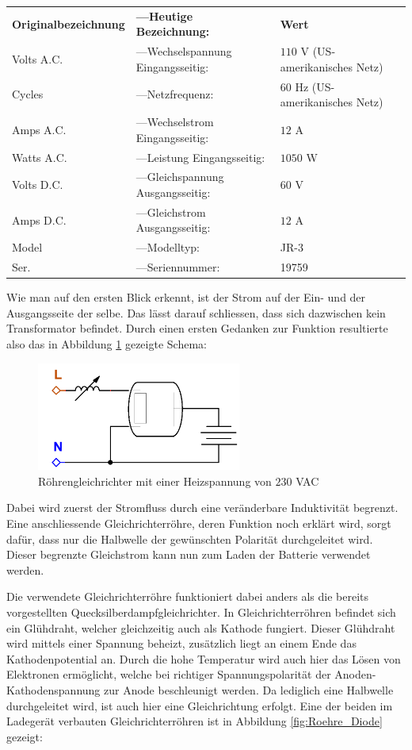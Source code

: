 \begin{tabular}{lll}
	\textbf{Originalbezeichnung} & \textbf{---\quad Heutige Bezeichnung:} & \textbf{Wert} \\
	Volts A.C. & ---\quad Wechselspannung Eingangsseitig: & $110$ V (US-amerikanisches Netz) \\
	Cycles & ---\quad Netzfrequenz: & $60$ Hz (US-amerikanisches Netz)\\
	Amps A.C. & ---\quad Wechselstrom Eingangsseitig: & $12$ A \\
	Watts A.C. & ---\quad Leistung Eingangsseitig: & $1050$ W \\
	Volts D.C. & ---\quad Gleichspannung Ausgangsseitig: & $60$ V \\
	Amps D.C. & ---\quad Gleichstrom Ausgangsseitig: & $12$ A \\
	Model & ---\quad Modelltyp: & JR-3 \\
	Ser. & ---\quad Seriennummer: & 19759
\end{tabular}

Wie man auf den ersten Blick erkennt, ist der Strom auf der Ein- und der Ausgangsseite der selbe. Das lässt darauf schliessen, dass sich dazwischen kein Transformator befindet. Durch einen ersten Gedanken zur Funktion resultierte also das in Abbildung \ref{fig:Ladegeraet1} gezeigte Schema:

\begin{figure}[h]
	\centering
		\includegraphics[width=0.60\textwidth]{images/Ladegeraet_Alt_1.PNG}
	\caption{Röhrengleichrichter mit einer Heizspannung von $230$ VAC}
	\label{fig:Ladegeraet1}
\end{figure}

Dabei wird zuerst der Stromfluss durch eine veränderbare Induktivität begrenzt. Eine anschliessende Gleichrichterröhre, deren Funktion noch erklärt wird, sorgt dafür, dass nur die Halbwelle der gewünschten Polarität durchgeleitet wird. Dieser begrenzte Gleichstrom kann nun zum Laden der Batterie verwendet werden.

Die verwendete Gleichrichterröhre funktioniert dabei anders als die bereits vorgestellten Quecksilberdampfgleichrichter. In Gleichrichterröhren befindet sich ein Glühdraht, welcher gleichzeitig auch als Kathode fungiert. Dieser Glühdraht wird mittels einer Spannung beheizt, zusätzlich liegt an einem Ende das Kathodenpotential an. Durch die hohe Temperatur wird auch hier das Lösen von Elektronen ermöglicht, welche bei richtiger Spannungspolarität der Anoden-Kathodenspannung zur Anode beschleunigt werden. Da lediglich eine Halbwelle durchgeleitet wird, ist auch hier eine Gleichrichtung erfolgt. Eine der beiden im Ladegerät verbauten Gleichrichterröhren ist in Abbildung \ref{fig:Roehre_Diode} gezeigt: \newpage

